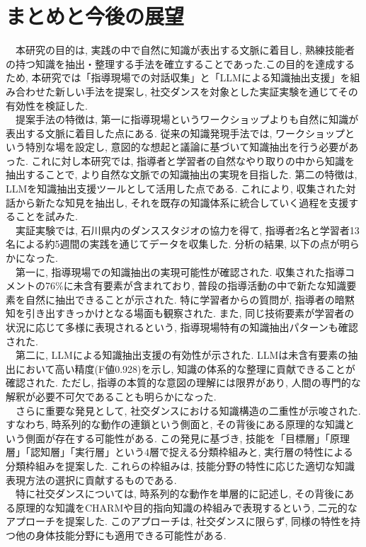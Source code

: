 \chapter{まとめと今後の展望}
　本研究の目的は, 実践の中で自然に知識が表出する文脈に着目し, 熟練技能者の持つ知識を抽出・整理する手法を確立することであった.この目的を達成するため, 本研究では「指導現場での対話収集」と「LLMによる知識抽出支援」を組み合わせた新しい手法を提案し, 社交ダンスを対象とした実証実験を通じてその有効性を検証した.\\
　提案手法の特徴は, 第一に指導現場というワークショップよりも自然に知識が表出する文脈に着目した点にある. 従来の知識発現手法では, ワークショップという特別な場を設定し, 意図的な想起と議論に基づいて知識抽出を行う必要があった. これに対し本研究では, 指導者と学習者の自然なやり取りの中から知識を抽出することで, より自然な文脈での知識抽出の実現を目指した. 第二の特徴は, LLMを知識抽出支援ツールとして活用した点である. これにより, 収集された対話から新たな知見を抽出し, それを既存の知識体系に統合していく過程を支援することを試みた. \\
　実証実験では, 石川県内のダンススタジオの協力を得て, 指導者2名と学習者13名による約5週間の実践を通じてデータを収集した. 分析の結果, 以下の点が明らかになった.\\
　第一に, 指導現場での知識抽出の実現可能性が確認された. 収集された指導コメントの76\%に未含有要素が含まれており, 普段の指導活動の中で新たな知識要素を自然に抽出できることが示された. 特に学習者からの質問が, 指導者の暗黙知を引き出すきっかけとなる場面も観察された. また, 同じ技術要素が学習者の状況に応じて多様に表現されるという, 指導現場特有の知識抽出パターンも確認された.\\
　第二に, LLMによる知識抽出支援の有効性が示された. LLMは未含有要素の抽出において高い精度(F値0.928)を示し, 知識の体系的な整理に貢献できることが確認された. ただし, 指導の本質的な意図の理解には限界があり, 人間の専門的な解釈が必要不可欠であることも明らかになった.\\
　さらに重要な発見として, 社交ダンスにおける知識構造の二重性が示唆された. すなわち, 時系列的な動作の連鎖という側面と, その背後にある原理的な知識という側面が存在する可能性がある. この発見に基づき, 技能を「目標層」「原理層」「認知層」「実行層」という4層で捉える分類枠組みと, 実行層の特性による分類枠組みを提案した. これらの枠組みは, 技能分野の特性に応じた適切な知識表現方法の選択に貢献するものである.\\
　特に社交ダンスについては, 時系列的な動作を単層的に記述し, その背後にある原理的な知識をCHARMや目的指向知識の枠組みで表現するという, 二元的なアプローチを提案した. このアプローチは, 社交ダンスに限らず, 同様の特性を持つ他の身体技能分野にも適用できる可能性がある.\\
